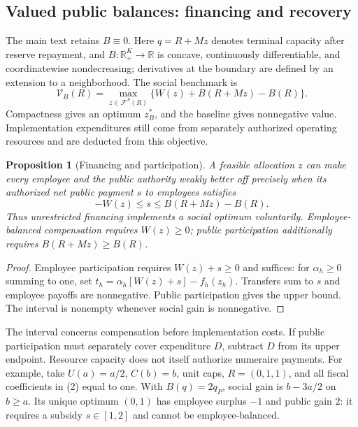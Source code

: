 \documentclass[ecta,draft,supplement]{econsocart}
\newtheorem{proposition}[theorem]{Proposition}
\theoremstyle{definition}
\theoremstyle{definition}
\newcommand{\R}{\mathbb R}
\newcommand{\FS}{\mathcal F^{S}}
\begin{document}
\begin{appendix}
\section{Valued public balances: financing and recovery}
\label{sec:implementation}\label{app:valuedbalances}

The main text retains $B\equiv0$. Here $q=R+Mz$ denotes terminal capacity
after reserve repayment, and $B:\R_+^K\to\R$ is concave, continuously
differentiable, and coordinatewise nondecreasing; derivatives at the boundary
are defined by an extension to a neighborhood. The social benchmark is
\begin{equation}
 \mathcal V_B(R)=\max_{z\in\FS(R)}
 \{W(z)+B(R+Mz)-B(R)\}.
 \tag{S$_B$}\label{eq:socialbenchmark}
\end{equation}
Compactness gives an optimum $z_B^*$, and the baseline gives nonnegative
value. Implementation expenditures still come from separately authorized
operating resources and are deducted from this objective.

\begin{proposition}[Financing and participation]
\label{prop:socialfinance}
A feasible allocation $z$ can make every employee and the public authority
weakly better off precisely when its authorized net public payment $s$ to
employees satisfies
\begin{equation}
 -W(z)\leq s\leq B(R+Mz)-B(R).
 \label{eq:publicfinanceinterval}
\end{equation}
Thus unrestricted financing implements a social optimum voluntarily.
Employee-balanced compensation requires $W(z)\geq0$; public participation
additionally requires $B(R+Mz)\geq B(R)$.
\end{proposition}
\begin{proof}
Employee participation requires $W(z)+s\geq0$ and suffices: for
$\alpha_h\geq0$ summing to one, set
$t_h=\alpha_h[W(z)+s]-f_h(z_h)$. Transfers sum to $s$ and employee
payoffs are nonnegative. Public participation gives the upper bound.
The interval is nonempty whenever social gain is nonnegative.
\end{proof}

The interval concerns compensation before implementation costs. If public
participation must separately cover expenditure $D$, subtract $D$ from its
upper endpoint. Resource capacity does not itself authorize numeraire
payments. For example, take $U(a)=a/2$, $C(b)=b$, unit caps,
$R=(0,1,1)$, and all fiscal coefficients in \textup{(2)}%
 equal
to one. With $B(q)=2q_P$, social gain is $b-3a/2$ on $b\geq a$.
Its unique optimum $(0,1)$ has employee surplus $-1$ and public gain $2$:
it requires a subsidy $s\in[1,2]$ and cannot be employee-balanced.


\end{appendix}
\end{document}
